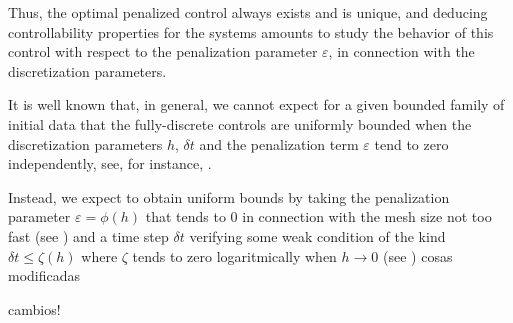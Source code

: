 Thus, the optimal penalized control always exists and is unique, and deducing controllability properties for the systems amounts to study the behavior of this control with respect to the penalization parameter $\varepsilon$, in connection with the discretization parameters.  

It is well known that, in general, we cannot expect for a given bounded family of initial data that the fully-discrete controls are uniformly bounded when the discretization parameters $h$, $\delta t$ and the penalization term $\varepsilon$ tend to zero independently, see, for instance, \cite{}. 

Instead, we expect to obtain uniform bounds by taking the penalization parameter $\varepsilon=\phi(h)$ that tends to 0 in connection with the mesh size not too fast (see \cite{}) and a time step $\delta t$ verifying some weak condition of the kind $\delta t\leq \zeta(h)$ where $\zeta$ tends to zero logaritmically when $h\to 0$ (see \cite{})
%
cosas modificadas

cambios!